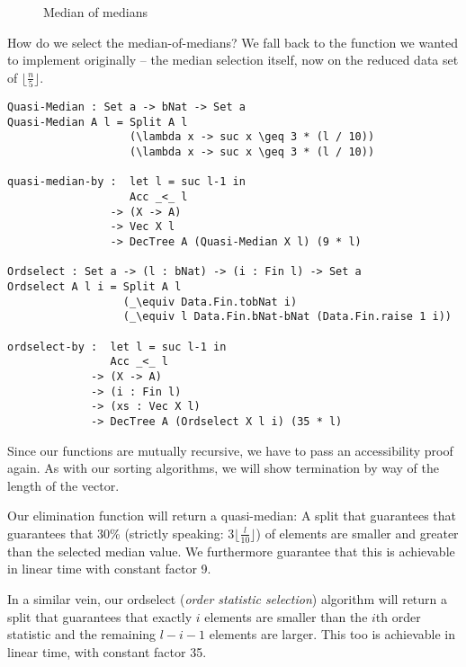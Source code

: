 \begin{figure}
\begin{center}
    
\end{center}
\caption{Median of medians}
\label{fig:median-of-medians}
\end{figure}

How do we select the median-of-medians? We fall back to the function we wanted to implement originally -- the median selection itself, now on the reduced data set of $\lfloor \frac n 5 \rfloor$.

\begin{lstlisting}[caption={Quasi-Median},label={lst:median:quasimedian},emph={Quasi,Median,quasi,median,by,ordselect,Ordselect}]
Quasi-Median : Set a -> bNat -> Set a
Quasi-Median A l = Split A l
                   (\lambda x -> suc x \geq 3 * (l / 10))
                   (\lambda x -> suc x \geq 3 * (l / 10))

quasi-median-by :  let l = suc l-1 in
                   Acc _<_ l
                -> (X -> A)
                -> Vec X l
                -> DecTree A (Quasi-Median X l) (9 * l)

Ordselect : Set a -> (l : bNat) -> (i : Fin l) -> Set a
Ordselect A l i = Split A l
                  (_\equiv Data.Fin.tobNat i)
                  (_\equiv l Data.Fin.bNat-bNat (Data.Fin.raise 1 i))

ordselect-by :  let l = suc l-1 in
                Acc _<_ l
             -> (X -> A)
             -> (i : Fin l)
             -> (xs : Vec X l)
             -> DecTree A (Ordselect X l i) (35 * l)
\end{lstlisting}

Since our functions are mutually recursive, we have to pass an accessibility proof again. As with our sorting algorithms, we will show termination by way of the length of the vector.

Our elimination function will return a quasi-median: A split that guarantees that guarantees that 30\% (strictly speaking: $3\lfloor \frac l {10}\rfloor$) of elements are smaller and greater than the selected median value. We furthermore guarantee that this is achievable in linear time with constant factor 9.

In a similar vein, our ordselect (\emph{order statistic selection}) algorithm will return a split that guarantees that exactly $i$ elements are smaller than the $i$th order statistic and the remaining $l - i - 1$ elements are larger. This too is achievable in linear time, with constant factor 35.

